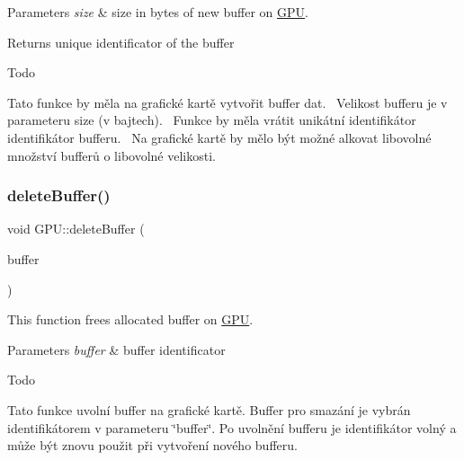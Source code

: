 \begin{DoxyParams}{Parameters}
{\em size} & size in bytes of new buffer on \hyperlink{classGPU}{G\+PU}.\\
\hline
\end{DoxyParams}
\begin{DoxyReturn}{Returns}
unique identificator of the buffer 
\end{DoxyReturn}
\begin{DoxyRefDesc}{Todo}
\item[\hyperlink{todo__todo000003}{Todo}]Tato funkce by měla na grafické kartě vytvořit buffer dat.~\newline
 Velikost bufferu je v parameteru size (v bajtech).~\newline
 Funkce by měla vrátit unikátní identifikátor identifikátor bufferu.~\newline
 Na grafické kartě by mělo být možné alkovat libovolné množství bufferů o libovolné velikosti.~\newline
 \end{DoxyRefDesc}
\mbox{\label{group__buffer__tasks_ga05fb19b7c8b51a92162517aa7f25a166}} 
\subsubsection{\texorpdfstring{delete\+Buffer()}{deleteBuffer()}}
{\footnotesize\ttfamily void G\+P\+U\+::delete\+Buffer (\begin{DoxyParamCaption}\item[{\hyperlink{fwd_8hpp_a5114031b77b80ad895eff688720b7f93}{Buffer\+ID}}]{buffer }\end{DoxyParamCaption})}



This function frees allocated buffer on \hyperlink{classGPU}{G\+PU}. 


\begin{DoxyParams}{Parameters}
{\em buffer} & buffer identificator \\
\hline
\end{DoxyParams}
\begin{DoxyRefDesc}{Todo}
\item[\hyperlink{todo__todo000004}{Todo}]Tato funkce uvolní buffer na grafické kartě. Buffer pro smazání je vybrán identifikátorem v parameteru \char`\"{}buffer\char`\"{}. Po uvolnění bufferu je identifikátor volný a může být znovu použit při vytvoření nového bufferu. \end{DoxyRefDesc}
\mbox{\label{group__buffer__tasks_ga7b89dbe4afbfec3725c64000b37445af}} 
